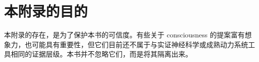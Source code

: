 \section{本附录的目的}

本附录的存在，是为了保护本书的可信度。有些关于 consciousness 的提案富有想象力，也可能具有重要性，但它们目前还不属于与实证神经科学或成熟动力系统工具相同的证据层级。本书并不忽略它们，而是将其隔离出来。